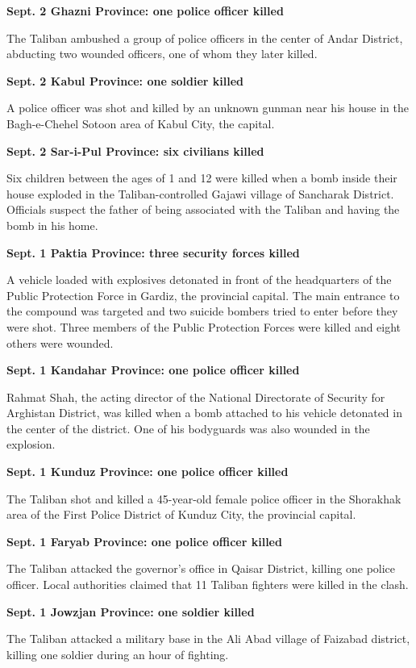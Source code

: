 \textbf{Sept. 2 Ghazni Province: one police officer killed}

The Taliban ambushed a group of police officers in the center of Andar
District, abducting two wounded officers, one of whom they later killed.

\textbf{Sept. 2 Kabul Province: one soldier killed}

A police officer was shot and killed by an unknown gunman near his house
in the Bagh-e-Chehel Sotoon area of Kabul City, the capital.

\textbf{Sept. 2 Sar-i-Pul Province: six civilians killed}

Six children between the ages of 1 and 12 were killed when a bomb inside
their house exploded in the Taliban-controlled Gajawi village of
Sancharak District. Officials suspect the father of being associated
with the Taliban and having the bomb in his home.

\textbf{Sept. 1 Paktia Province: three security forces killed}

A vehicle loaded with explosives detonated in front of the headquarters
of the Public Protection Force in Gardiz, the provincial capital. The
main entrance to the compound was targeted and two suicide bombers tried
to enter before they were shot. Three members of the Public Protection
Forces were killed and eight others were wounded.

\textbf{Sept. 1 Kandahar Province: one police officer killed}

Rahmat Shah, the acting director of the National Directorate of Security
for Arghistan District, was killed when a bomb attached to his vehicle
detonated in the center of the district. One of his bodyguards was also
wounded in the explosion.

\textbf{Sept. 1 Kunduz Province: one police officer killed}

The Taliban shot and killed a 45-year-old female police officer in the
Shorakhak area of the First Police District of Kunduz City, the
provincial capital.

\textbf{Sept. 1 Faryab Province: one police officer killed}

The Taliban attacked the governor's office in Qaisar District, killing
one police officer. Local authorities claimed that 11 Taliban fighters
were killed in the clash.

\textbf{Sept. 1 Jowzjan Province: one soldier killed}

The Taliban attacked a military base in the Ali Abad village of Faizabad
district, killing one soldier during an hour of fighting.

